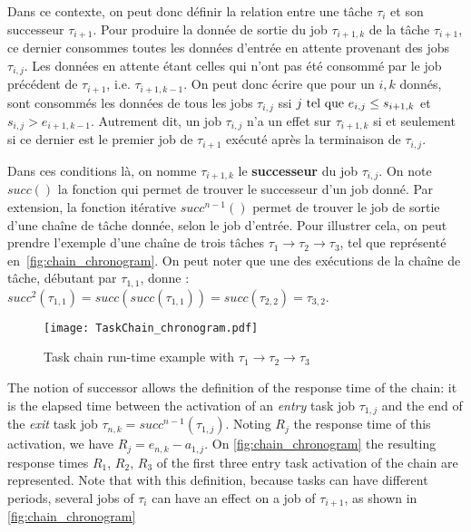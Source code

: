 \documentclass[french, a4paper, 11pt, twoside, pdftex]{StyleThese}
\begin{document}
    Dans ce contexte, on peut donc définir la relation entre une tâche $\tau_i$ et son successeur $\tau_{i+1}$. Pour produire la donnée de sortie du job $\tau_{i+1,k}$ de la tâche $\tau_{i+1}$, ce dernier consommes toutes les données d'entrée en attente provenant des jobs $\tau_{i,j}$. Les données en attente étant celles qui n'ont pas été consommé par le job précédent de $\tau_{i+1}$, i.e. $\tau_{i+1,k-1}$. On peut donc écrire que pour un $i,k$ donnés, sont consommés les données de tous les jobs $\tau_{i,j}$ ssi $j \textup{ tel que } e_{i,j} \leq s_{i+1, k}$ et $s_{i,j} > e_{i+1, k-1}$. Autrement dit, un job $\tau_{i,j}$ n'a un effet sur $\tau_{i+1,k}$ si et seulement si ce dernier est le premier job de $\tau_{i+1}$ exécuté après la terminaison de $\tau_{i,j}$.

    
    Dans ces conditions là, on nomme $\tau_{i+1,k}$ le \textbf{successeur} du job $\tau_{i,j}$. On note $succ()$ la fonction qui permet de trouver le successeur d'un job donné. Par extension, la fonction itérative $succ^{n-1}()$ permet de trouver le job de sortie d'une chaîne de tâche donnée, selon le job d'entrée. 
    Pour illustrer cela, on peut prendre l'exemple d'une chaîne de trois tâches $\tau_1 \rightarrow \tau_2 \rightarrow \tau_3$, tel que représenté en~\autoref{fig:chain_chronogram}. On peut noter que une des exécutions de la chaîne de tâche, débutant par $\tau_{1,1}$, donne : $succ^{2}(\tau_{1,1}) = succ(succ(\tau_{1,1})) = succ(\tau_{2,2}) = \tau_{3,2}$. %


    \begin{figure}[ht]
        \centering
        \texttt{[image: TaskChain\_chronogram.pdf]}
        \caption{Task chain run-time example with $\tau_1 \rightarrow \tau_2 \rightarrow \tau_3$}
        \label{fig:chain_chronogram}
    \end{figure}
        
    The notion of successor allows the definition of the response time of the chain: it is the elapsed time between the activation of an \emph{entry} task job $\tau_{1, j}$ and the end of the \emph{exit} task job $\tau_{n, k} = succ^{n-1}(\tau_{1, j})$. Noting $R_{j}$ the response time of this activation, we have $R_{j} = e_{n,k} - a_{1,j}$. On \autoref{fig:chain_chronogram} the resulting response times $R_1$, $R_2$, $R_3$ of the first three entry task activation of the chain are represented. 
    Note that with this definition, because tasks can have different periods, several jobs of $\tau_i$ can have an effect on a job of $\tau_{i+1}$, as shown in \autoref{fig:chain_chronogram} 
\end{document}
